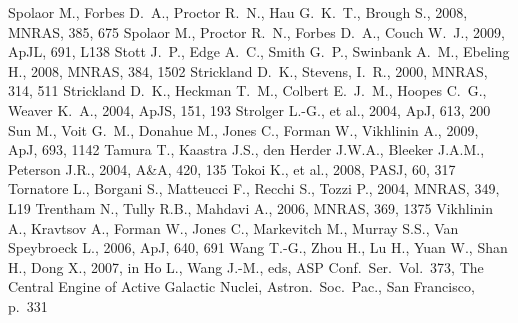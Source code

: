 \documentclass[useAMS,usenatbib]{mn2e}
\begin{document}
\begin{thebibliography}{}
   Spolaor M., Forbes D.~A., Proctor R.~N., Hau G.~K.~T., Brough S., 2008, 
   MNRAS, 385, 675
   Spolaor M., Proctor R.~N., Forbes D.~A., Couch W.~J., 2009, ApJL, 691, L138 
   Stott J.~P., Edge A.~C., Smith G.~P., Swinbank A.~M., Ebeling H., 2008,
   MNRAS, 384, 1502 
   Strickland D.~K., Stevens, I.~R., 2000, MNRAS, 314, 511 
   Strickland D.~K., Heckman T.~M., Colbert E.~J.~M., Hoopes C.~G., 
   Weaver K.~A., 2004, ApJS, 151, 193 
   Strolger L.-G., et al., 2004, ApJ, 613, 200 
   Sun M., Voit G.~M., Donahue M., Jones C., Forman W., Vikhlinin A., 2009, 
   ApJ, 693, 1142 
   Tamura T., Kaastra J.S., den Herder J.W.A., Bleeker J.A.M., Peterson J.R.,
   2004, A\&A, 420, 135  
   Tokoi K., et al., 2008, PASJ, 60, 317 
   Tornatore L., Borgani S., Matteucci F., Recchi S., Tozzi P., 2004, MNRAS, 
   349, L19 
   Trentham N., Tully R.B., Mahdavi A., 2006, MNRAS, 369, 1375 
   Vikhlinin A., Kravtsov A., Forman W., Jones C., Markevitch M., Murray S.S.,
   Van Speybroeck L., 2006, ApJ, 640, 691
   Wang T.-G., Zhou H., Lu H., Yuan W., Shan H., Dong X., 2007, in 
   Ho L., Wang J.-M., eds, ASP Conf.\ Ser.\ Vol.~373, The Central Engine of 
   Active Galactic Nuclei, Astron.\ Soc.\ Pac., San Francisco, p.~331
\end{thebibliography} 


 
\bsp 
 




\label{lastpage} 
 
\end{document}
